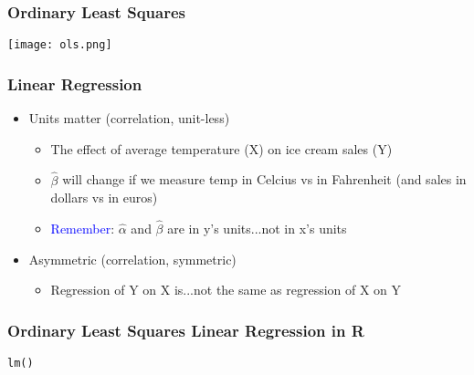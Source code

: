 \documentclass[handout]{beamer}
\newcommand{\blue}{\textcolor{blue}}
\begin{document}
\begin{frame}
 \frametitle{Ordinary Least Squares}
 \begin{center}
 \texttt{[image: ols.png]}
 \end{center}
\end{frame}

\begin{frame}
 \frametitle{Linear Regression}
 \begin{itemize}[<+->]
   \item<1-> Units matter (correlation, unit-less) \pause
     \begin{itemize}
       \item The effect of average temperature (X) on ice cream sales (Y)
       \item $\hat{\beta}$ will change if we measure temp in Celcius vs in Fahrenheit (and sales in dollars vs in euros)
       \item \blue{Remember}: $\hat{\alpha}$ and $\hat{\beta}$ are in y's units...not in x's units
     \end{itemize}
   \item<2-> Asymmetric (correlation, symmetric)
     \begin{itemize}
       \item Regression of Y on X is...not the same as regression of X on Y
     \end{itemize}   
 \end{itemize}
\end{frame}

\begin{frame}
 \frametitle{Ordinary Least Squares Linear Regression in R}
 {\tt lm()}
\end{frame}


%

\end{document}
